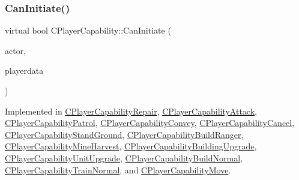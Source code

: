 \subsubsection{\texorpdfstring{Can\+Initiate()}{CanInitiate()}}
{\footnotesize\ttfamily virtual bool C\+Player\+Capability\+::\+Can\+Initiate (\begin{DoxyParamCaption}\item[{std\+::shared\+\_\+ptr$<$ \hyperlink{classCPlayerAsset}{C\+Player\+Asset} $>$}]{actor,  }\item[{std\+::shared\+\_\+ptr$<$ \hyperlink{classCPlayerData}{C\+Player\+Data} $>$}]{playerdata }\end{DoxyParamCaption})\hspace{0.3cm}{\ttfamily [pure virtual]}}



Implemented in \hyperlink{classCPlayerCapabilityRepair_a579761cab74d447b95856a24a7841b2e}{C\+Player\+Capability\+Repair}, \hyperlink{classCPlayerCapabilityAttack_ab1cda67a8e637a90accf03d1581d4072}{C\+Player\+Capability\+Attack}, \hyperlink{classCPlayerCapabilityPatrol_a48e60ecd544759f3aad66afeb4a6e0a9}{C\+Player\+Capability\+Patrol}, \hyperlink{classCPlayerCapabilityConvey_a6c5ebd62a9c3a619c56e070aca5443a7}{C\+Player\+Capability\+Convey}, \hyperlink{classCPlayerCapabilityCancel_a8b4ad4a4983b01e458d439cf68fd2ba9}{C\+Player\+Capability\+Cancel}, \hyperlink{classCPlayerCapabilityStandGround_a5567bfa47166f4080bd2b86f5c33e29c}{C\+Player\+Capability\+Stand\+Ground}, \hyperlink{classCPlayerCapabilityBuildRanger_ad8b45a3ffc7ee82d5550cc690823d82c}{C\+Player\+Capability\+Build\+Ranger}, \hyperlink{classCPlayerCapabilityMineHarvest_a37944eb249559f1246348b47e3f24dee}{C\+Player\+Capability\+Mine\+Harvest}, \hyperlink{classCPlayerCapabilityBuildingUpgrade_af515cec6f1a28607864c853307e17d7c}{C\+Player\+Capability\+Building\+Upgrade}, \hyperlink{classCPlayerCapabilityUnitUpgrade_ad01fc5df598efea4063ac2bbf0ba34e9}{C\+Player\+Capability\+Unit\+Upgrade}, \hyperlink{classCPlayerCapabilityBuildNormal_a5487e5521779846198604e8ebadaf283}{C\+Player\+Capability\+Build\+Normal}, \hyperlink{classCPlayerCapabilityTrainNormal_ac49cf646b94220844a03b7c3a8a7f215}{C\+Player\+Capability\+Train\+Normal}, and \hyperlink{classCPlayerCapabilityMove_aef25bc0d224e993c46f5cd4cd6b8b7c8}{C\+Player\+Capability\+Move}.

\hypertarget{classCPlayerCapability_a881ba4b87385d7cfe5cb6ced2d26f226}{}\label{classCPlayerCapability_a881ba4b87385d7cfe5cb6ced2d26f226} 
